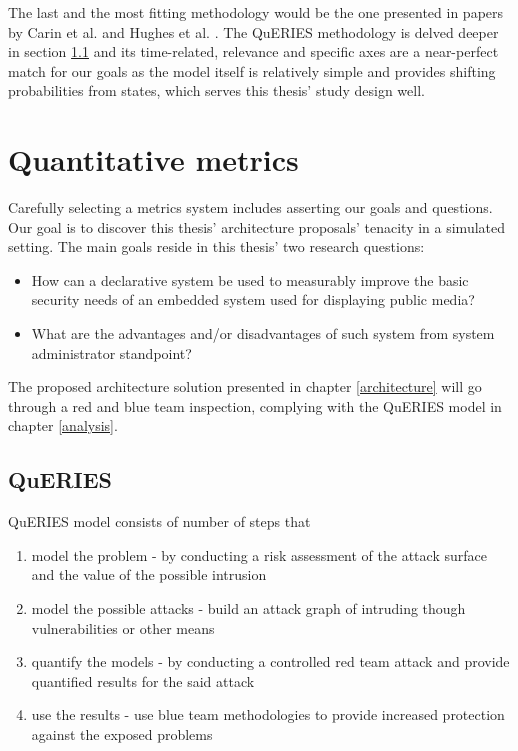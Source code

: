 The last and the most fitting methodology would be the one presented
in papers by Carin et al. \cite{carin2008cybersecurity} and Hughes et al.
\cite{hughes2013quantitative}. The QuERIES
methodology is delved deeper in section \ref{querieschapter} and its
time-related, relevance and specific axes are a near-perfect match for
our goals as the model itself is relatively simple and provides
shifting probabilities from states, which serves this thesis' study
design well.

\section{Quantitative metrics} \label{quantitativemetrics}

Carefully selecting a metrics system includes asserting our goals and
questions. Our goal is to discover this thesis' architecture proposals'
tenacity in a simulated setting. The main goals reside in this thesis'
two research questions:

\begin{itemize}
\item How can a declarative system be used to measurably improve the basic
  security needs of an embedded system used for displaying public
  media?
\item What are the advantages and/or disadvantages of such system from
  system administrator standpoint?
\end{itemize}

The proposed architecture solution presented in chapter
\ref{architecture} will go through a red and blue team inspection,
complying with the QuERIES model in chapter \ref{analysis}.

\subsection{QuERIES} \label{querieschapter}
QuERIES model consists of number of steps that

\begin{enumerate}
  \item model the problem - by conducting a risk assessment of the
    attack surface and the value of the possible intrusion
  \item model the possible attacks - build an attack graph of
    intruding though vulnerabilities or other means
  \item quantify the models - by conducting a controlled red team
    attack and provide quantified results for the said attack
  \item use the results - use blue team methodologies to provide
    increased protection against the exposed problems
  
\end{enumerate}

